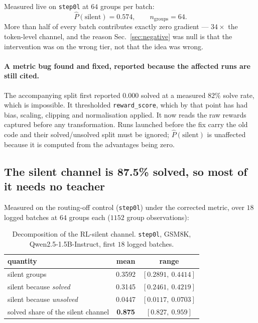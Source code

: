 Measured live on \texttt{step0l} at $64$ groups per batch:
\[
  \widehat{P}(\text{silent}) = 0.574, \qquad n_{\text{groups}} = 64 .
\]
More than half of every batch contributes exactly zero gradient --- $34\times$ the
token-level channel, and the reason Sec.~\ref{sec:negative} was null is that the
intervention was on the wrong tier, not that the idea was wrong.

\paragraph{A metric bug found and fixed, reported because the affected runs are still
cited.} The accompanying split first reported $0.000$ solved at a measured $82\%$ solve
rate, which is impossible. It thresholded \texttt{reward\_score}, which by that point has
had bias, scaling, clipping and normalisation applied. It now reads the raw rewards captured
before any transformation. Runs launched before the fix carry the old code and their
solved/unsolved split must be ignored; $\widehat{P}(\text{silent})$ is unaffected because it
is computed from the advantages being zero.

\subsection{The silent channel is 87.5\% solved, so most of it needs no teacher}
\label{sec:split}

Measured on the routing-off control (\texttt{step0l}) under the corrected metric, over $18$
logged batches at $64$ groups each ($1152$ group observations):

\begin{table}[t]
\centering\small
\caption{Decomposition of the RL-silent channel. \texttt{step0l}, GSM8K,
Qwen2.5-1.5B-Instruct, first $18$ logged batches.}
\label{tab:split}
\begin{tabular}{lcc}
\toprule
quantity & mean & range \\
\midrule
silent groups                      & 0.3592 & $[0.2891,\ 0.4414]$ \\
\quad silent because \emph{solved}   & 0.3145 & $[0.2461,\ 0.4219]$ \\
\quad silent because \emph{unsolved} & 0.0447 & $[0.0117,\ 0.0703]$ \\
\midrule
solved share of the silent channel & \textbf{0.875} & $[0.827,\ 0.959]$ \\
\bottomrule
\end{tabular}
\end{table}

